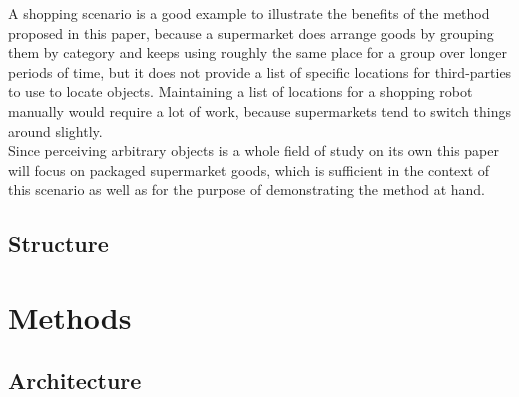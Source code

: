 \documentclass[11pt, twoside, a4paper]{report}
\begin{document}
A shopping scenario is a good example to illustrate the benefits of the method proposed in this paper, because a supermarket does arrange goods by grouping them by category and keeps using roughly the same place for a group over longer periods of time, but it does not provide a list of specific locations for third-parties to use to locate objects. Maintaining a list of locations for a shopping robot manually would require a lot of work, because supermarkets tend to switch things around slightly. \\

Since perceiving arbitrary objects is a whole field of study on its own this paper will focus on packaged supermarket goods, which is sufficient in the context of this scenario as well as for the purpose of demonstrating the method at hand.

\section{Structure}


\newpage
\chapter{Methods}

\section{Architecture} %

\newpage
\begin{figure}
\end{figure}
\end{document}
